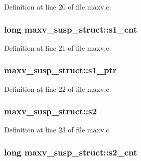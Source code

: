 Definition at line 20 of file maxv.\+c.

\subsubsection[{\texorpdfstring{s1\+\_\+cnt}{s1_cnt}}]{\setlength{\rightskip}{0pt plus 5cm}long maxv\+\_\+susp\+\_\+struct\+::s1\+\_\+cnt}\hypertarget{structmaxv__susp__struct_a50077b93f72dedc0261126c096ec122e}{}\label{structmaxv__susp__struct_a50077b93f72dedc0261126c096ec122e}


Definition at line 21 of file maxv.\+c.

\subsubsection[{\texorpdfstring{s1\+\_\+ptr}{s1_ptr}}]{ maxv\+\_\+susp\+\_\+struct\+::s1\+\_\+ptr}\hypertarget{structmaxv__susp__struct_a42db5d6d6ee7ada26422237fe40058c0}{}\label{structmaxv__susp__struct_a42db5d6d6ee7ada26422237fe40058c0}


Definition at line 22 of file maxv.\+c.

\subsubsection[{\texorpdfstring{s2}{s2}}]{ maxv\+\_\+susp\+\_\+struct\+::s2}\hypertarget{structmaxv__susp__struct_acac48aed56d1e4af41f047267dd3f55a}{}\label{structmaxv__susp__struct_acac48aed56d1e4af41f047267dd3f55a}


Definition at line 23 of file maxv.\+c.

\subsubsection[{\texorpdfstring{s2\+\_\+cnt}{s2_cnt}}]{\setlength{\rightskip}{0pt plus 5cm}long maxv\+\_\+susp\+\_\+struct\+::s2\+\_\+cnt}\hypertarget{structmaxv__susp__struct_a1bddbee7aefcf1c5820097d9c4c50cf9}{}\label{structmaxv__susp__struct_a1bddbee7aefcf1c5820097d9c4c50cf9}


